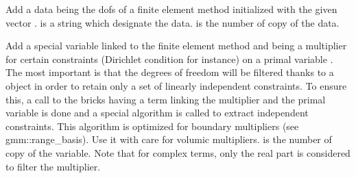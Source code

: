 \documentclass[a4paper,11pt,english]{sphinxmanual}
\begin{document}

\begin{fulllineitems}
\label{\detokenize{userdoc/model_object:_CPPv4N6getfem5model24add_initialized_fem_dataE4name2mf1V5niter}}%
\pysigstartmultiline
{}%
\pysigstopmultiline
Add a data being the dofs of a finite element method  initialized with
the given vector .  is a string which designate the data.
 is the number of copy of the data.

\end{fulllineitems}


\begin{fulllineitems}
\label{\detokenize{userdoc/model_object:_CPPv4N6getfem5model14add_multiplierE4name2mf11primal_name5niter}}%
\pysigstartmultiline
{}%
\pysigstopmultiline
Add a special variable linked to the finite element method  and being a
multiplier for certain constraints (Dirichlet condition for instance) on a
primal variable . The most important is that the degrees of
freedom will be filtered thanks to a  object in order to
retain only a set of linearly independent constraints. To ensure this, a call
to the bricks having a term linking the multiplier and the primal variable is
done and a special algorithm is called to extract independent constraints. This
algorithm is optimized for boundary multipliers (see gmm::range\_basis). Use it
with care for volumic multipliers.  is the number of copy of the
variable. Note that for complex terms, only
the real part is considered to filter the multiplier.

\end{fulllineitems}
\end{document}
